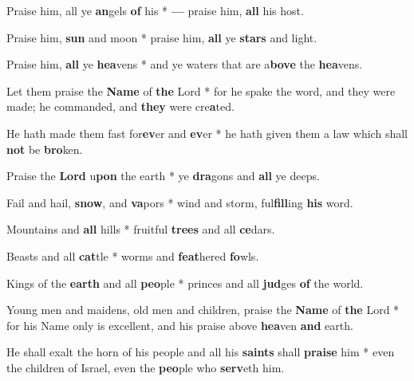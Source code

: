 \begin{multicols}{2}
	Praise him, all ye \textbf{an}gels \textbf{of} his * \textbf{---} praise him, \textbf{all} his host.
	
	Praise him, \textbf{sun} and moon * praise him, \textbf{all} ye \textbf{stars} and light.
	
	Praise him, \textbf{all} ye \textbf{hea}vens * and ye waters that are a\textbf{bove} the \textbf{hea}vens.
	
	Let them praise the \textbf{Name} of \textbf{the} Lord * for he spake the word, and they were made; he commanded, and \textbf{they} were cre\textbf{a}ted.
	
	He hath made them fast for\textbf{ev}er and \textbf{ev}er * he hath given them a law which shall \textbf{not} be \textbf{bro}ken.
	
	Praise the \textbf{Lord} u\textbf{pon} the earth * ye \textbf{dra}gons and \textbf{all} ye deeps.
	
	Fail and hail, \textbf{snow}, and \textbf{va}pors * wind and storm, ful\textbf{fill}ing \textbf{his} word.
	
	Mountains and \textbf{all} hills * fruitful \textbf{trees} and all \textbf{ce}dars.
	
	Beasts and all \textbf{cat}tle * worms and \textbf{feat}hered \textbf{fo}wls.
	
	Kings of the \textbf{earth} and all \textbf{peo}ple * princes and all \textbf{jud}ges \textbf{of} the world.
	
	Young men and maidens, old men and children, praise the \textbf{Name} of \textbf{the} Lord * for his Name only is excellent, and his praise above \textbf{hea}ven \textbf{and} earth.
	
	He shall exalt the horn of his people and all his \textbf{saints} shall \textbf{praise} him * even the children of Israel, even the \textbf{peo}ple who \textbf{serv}eth him.
\end{multicols}